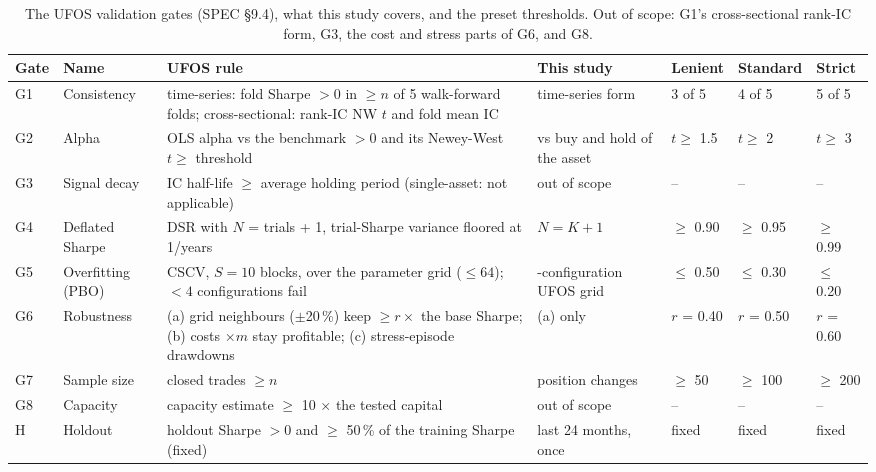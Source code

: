 \begin{table}[H]
\centering
\scriptsize
\caption{The UFOS validation gates (SPEC \S 9.4), what this study covers, and the preset thresholds. Out of scope: G1's cross-sectional rank-IC form, G3, the cost and stress parts of G6, and G8.}
\label{tab:O1_gates_scope}
\setlength{\tabcolsep}{3pt}
\begin{tabular}{>{\raggedright\arraybackslash}p{0.75cm}>{\raggedright\arraybackslash}p{1.7cm}>{\raggedright\arraybackslash}p{5.1cm}>{\raggedright\arraybackslash}p{2.3cm}lll}
\toprule
Gate & Name & UFOS rule & This study & Lenient & Standard & Strict \\
\midrule
G1 & Consistency & time-series: fold Sharpe $> 0$ in $\ge n$ of 5 walk-forward folds; cross-sectional: rank-IC NW $t$ and fold mean IC & time-series form & 3 of 5 & 4 of 5 & 5 of 5 \\
G2 & Alpha & OLS alpha vs the benchmark $> 0$ and its Newey-West $t \ge$ threshold & vs buy and hold of the asset & $t \ge$ 1.5 & $t \ge$ 2 & $t \ge$ 3 \\
G3 & Signal decay & IC half-life $\ge$ average holding period (single-asset: not applicable) & out of scope & -- & -- & -- \\
G4 & Deflated Sharpe & DSR with $N$ = trials + 1, trial-Sharpe variance floored at 1/years & $N = K + 1$ & $\ge$ 0.90 & $\ge$ 0.95 & $\ge$ 0.99 \\
G5 & Overfitting (PBO) & CSCV, $S = 10$ blocks, over the parameter grid ($\le 64$); $< 4$ configurations fail & 64-configuration UFOS grid & $\le$ 0.50 & $\le$ 0.30 & $\le$ 0.20 \\
G6 & Robustness & (a) grid neighbours ($\pm$20\,\%) keep $\ge r\times$ the base Sharpe; (b) costs $\times m$ stay profitable; (c) stress-episode drawdowns & (a) only & $r$ = 0.40 & $r$ = 0.50 & $r$ = 0.60 \\
G7 & Sample size & closed trades $\ge n$ & position changes & $\ge$ 50 & $\ge$ 100 & $\ge$ 200 \\
G8 & Capacity & capacity estimate $\ge$ 10 $\times$ the tested capital & out of scope & -- & -- & -- \\
H & Holdout & holdout Sharpe $> 0$ and $\ge$ 50\,\% of the training Sharpe (fixed) & last 24 months, once & fixed & fixed & fixed \\
\bottomrule
\end{tabular}
\end{table}
